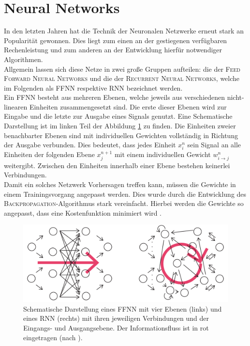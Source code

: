 \section{Neural Networks}
In den letzten Jahren hat die Technik der Neuronalen Netzwerke erneut stark an Popularität gewonnen. Dies liegt zum einen an der gestiegenen verfügbaren Rechenleistung und zum anderen an der Entwicklung hierfür notwendiger Algorithmen.\\
Allgemein lassen sich diese Netze in zwei große Gruppen aufteilen: die der \textsc{Feed Forward Neural Networks} und die der \textsc{Recurrent Neural Networks}, welche im Folgenden als \textsc{FFNN} respektive \textsc{RNN} bezeichnet werden.\\

Ein \textsc{FFNN} besteht aus mehreren Ebenen, welche jeweils aus verschiedenen nicht-linearen Einheiten zusammengesetzt sind. Die erste dieser Ebenen wird zur Eingabe und die letzte zur Ausgabe eines Signals genutzt. Eine Schematische Darstellung ist im linken Teil der Abbildung \ref{fig:ffnn_rnn_structure} zu finden. Die Einheiten zweier benachbarter Ebenen sind mit individuellen Gewichten vollständig in Richtung der Ausgabe verbunden. Dies bedeutet, dass jedes Einheit $x^n_i$ sein Signal an alle Einheiten der folgenden Ebene $x^{n+1}_j$ mit einem individuellen Gewicht $w^n_{i \rightarrow j}$ weitergibt. Zwischen den Einheiten innerhalb einer Ebene bestehen keinerlei Verbindungen.\\
Damit ein solches Netzwerk Vorhersagen treffen kann, müssen die Gewichte in einem Trainingsvorgang angepasst werden. Dies wurde durch die Entwicklung des \textsc{Backpropagation}-Algorithmus stark vereinfacht. Hierbei werden die Gewichte so angepasst, dass eine Kostenfunktion minimiert wird \cite[S. 225-290]{bishop}.\\

\begin{figure}[H]
    \centering
    \includegraphics[width = 0.9 \textwidth]{figures/ffnn_rnn_structure(new).pdf}
    \caption{Schematische Darstellung eines \textsc{FFNN} mit vier Ebenen (links) und eines \textsc{RNN} (rechts) mit ihren jeweiligen Verbindungen und der Eingangs- und Ausgangsebene. Der Informationsfluss ist in rot eingetragen (nach \citep{jeagerTut2002}).}
    \label{fig:ffnn_rnn_structure}
\end{figure}

